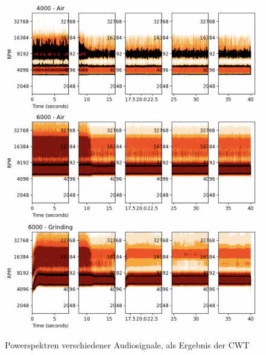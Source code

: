 \begin{figure}[H]
    \centering
    \includegraphics[width=0.8\linewidth]{Studienarbeit//images/cwt-4000-air.png}     
    \centering
    \includegraphics[width=0.8\linewidth]{Studienarbeit//images/cwt-6000-air.png}  
    \centering
    \includegraphics[width=0.8\linewidth]{Studienarbeit//images/cwt-6000-grinding.png}    
    \caption{Powerspektren verschiedener Audiosignale, als Ergebnis der CWT}
    \label{fig:cwt-powerspek-1}
\end{figure}


